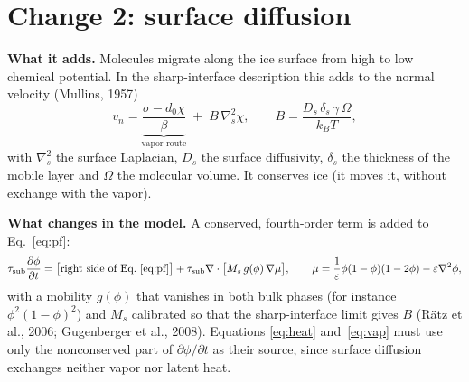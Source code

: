 \documentclass[11pt]{article}
\newcommand{\pd}[2]{\frac{\partial #1}{\partial #2}}
\begin{document}
\section{Change 2: surface diffusion}

\textbf{What it adds.} Molecules migrate along the ice surface from high to
low chemical potential. In the sharp-interface description this adds to the
normal velocity (Mullins, 1957)
\begin{equation}
v_n = \underbrace{\frac{\sigma - d_0\chi}{\beta}}_{\text{vapor route}} \;+\; B\,\nabla_s^{2}\chi ,
\qquad B = \frac{D_s\,\delta_s\,\gamma\,\Omega}{k_BT} ,
\label{eq:mullins}
\end{equation}
with $\nabla_s^{2}$ the surface Laplacian, $D_s$ the surface diffusivity,
$\delta_s$ the thickness of the mobile layer and $\Omega$ the molecular
volume. It conserves ice (it moves it, without exchange with the vapor).

\textbf{What changes in the model.} A conserved, fourth-order term is added
to Eq.~\eqref{eq:pf}:
\begin{equation}
\tau_{\mathrm{sub}}\pd{\phi}{t} = \big[\text{right side of Eq.~\eqref{eq:pf}}\big]
 + \tau_{\mathrm{sub}}\nabla\cdot\big[M_s\,g(\phi)\,\nabla\mu\big],
\qquad \mu = \frac{1}{\varepsilon}\phi(1-\phi)(1-2\phi) - \varepsilon\nabla^{2}\phi ,
\end{equation}
with a mobility $g(\phi)$ that vanishes in both bulk phases (for instance
$\phi^{2}(1-\phi)^{2}$) and $M_s$ calibrated so that the sharp-interface limit
gives $B$ (R\"atz et al., 2006; Gugenberger et al., 2008). Equations
\eqref{eq:heat} and~\eqref{eq:vap} must use only the nonconserved part of
$\partial\phi/\partial t$ as their source, since surface diffusion exchanges
neither vapor nor latent heat.
\end{document}
